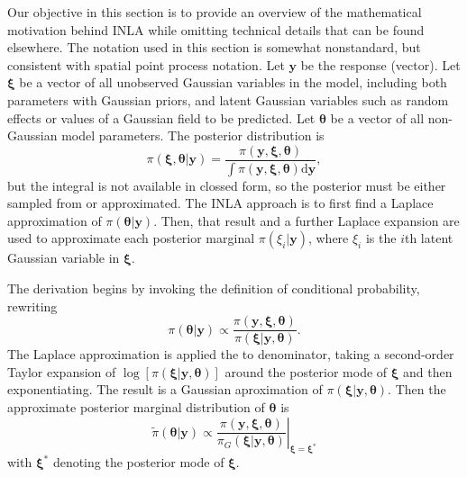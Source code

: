 \documentclass[]{interact}
\begin{document}
Our objective in this section is to provide an overview of the mathematical
motivation behind INLA while omitting technical details that can be found
elsewhere. The notation used in this section is somewhat nonstandard, but
consistent with spatial point process notation. Let \(\mathbf{y}\) be the
response (vector). Let \(\boldsymbol{\xi}\) be a vector of all unobserved
Gaussian variables in the model, including both parameters with Gaussian
priors, and latent Gaussian variables such as random effects or values of a
Gaussian field to be predicted. Let \(\boldsymbol{\theta}\) be a vector of all
non-Gaussian model parameters. The posterior distribution is
\begin{displaymath}
\pi\left(\boldsymbol{\xi}, \boldsymbol{\theta}| \mathbf{y}\right)
= \frac{\pi\left(\mathbf{y}, \boldsymbol{\xi}, \boldsymbol{\theta}\right)}
{\int \pi\left(\mathbf{y}, \boldsymbol{\xi}, \boldsymbol{\theta}\right)
\mathrm{d}\mathbf{y}},
\end{displaymath}
but the integral is not available in clossed form, so the posterior must be
either sampled from or approximated. The INLA approach is to first find a
Laplace approximation of \(\pi\left(\boldsymbol{\theta} | \mathbf{y}\right)\).
Then, that result and a further Laplace expansion are used to approximate each
posterior marginal \(\pi\left(\xi_{i}| \mathbf{y}\right)\), where \(\xi_{i}\)
is the \(i\)th latent Gaussian variable in \(\boldsymbol{\xi}\).

The derivation begins by invoking the definition of conditional probability,
rewriting
\begin{displaymath}
\pi\left(\boldsymbol{\theta} | \mathbf{y}\right)
\propto \frac{\pi\left(\mathbf{y}, \boldsymbol{\xi}, \boldsymbol{\theta}\right)}
{\pi\left(\boldsymbol{\xi} | \mathbf{y}, \boldsymbol{\theta}\right)}.
\end{displaymath}
The Laplace approximation is applied the to denominator, taking a second-order
Taylor expansion of
\(\log\left[\pi\left(\boldsymbol{\xi} | \mathbf{y}, \boldsymbol{\theta}\right)\right]\)
around the posterior mode of \(\boldsymbol{\xi}\) and then exponentiating. The
result is a Gaussian aproximation of
\(\pi\left(\boldsymbol{\xi} | \mathbf{y}, \boldsymbol{\theta}\right)\). Then
the approximate posterior marginal distribution of \(\boldsymbol{\theta}\) is
\begin{displaymath}
\tilde{\pi}\left(\boldsymbol{\theta} | \mathbf{y}\right)
\propto \left.\frac{\pi\left(\mathbf{y}, \boldsymbol{\xi}, \boldsymbol{\theta}\right)}
{\pi_{G}\left(\boldsymbol{\xi} | \mathbf{y}, \boldsymbol{\theta}\right)}
\right|_{\boldsymbol{\xi}=\boldsymbol{\xi}^{*}}
\end{displaymath}
with \(\boldsymbol{\xi}^{*}\) denoting the posterior mode of
\(\boldsymbol{\xi}\).
\end{document}
